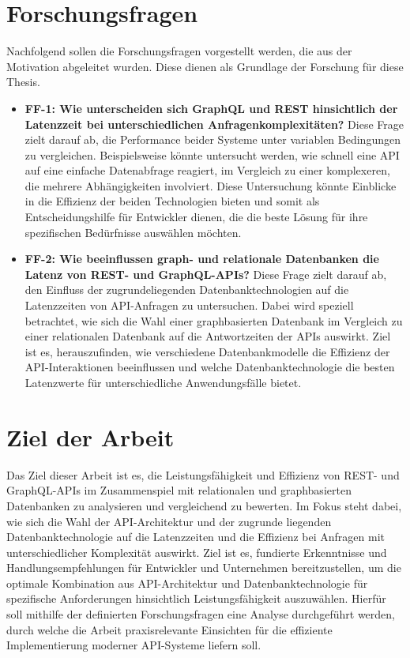\section{Forschungsfragen} %
\label{sec:forschungsfragen}
Nachfolgend sollen die Forschungsfragen vorgestellt werden, die aus der Motivation abgeleitet wurden. Diese dienen als Grundlage der Forschung für diese Thesis.
\begin{itemize}
	\item \textbf{FF-1: Wie unterscheiden sich GraphQL und REST hinsichtlich der Latenzzeit bei unterschiedlichen Anfragenkomplexitäten?}  Diese Frage zielt darauf ab, die Performance beider Systeme unter variablen Bedingungen zu vergleichen. Beispielsweise könnte untersucht werden, wie schnell eine API auf eine einfache Datenabfrage reagiert, im Vergleich zu einer komplexeren, die mehrere Abhängigkeiten involviert. Diese Untersuchung könnte Einblicke in die Effizienz der beiden Technologien bieten und somit als Entscheidungshilfe für Entwickler dienen, die die beste Lösung für ihre spezifischen Bedürfnisse auswählen möchten.
	\item \textbf{FF-2: Wie beeinflussen graph- und relationale Datenbanken die Latenz von REST- und GraphQL-APIs?} Diese Frage zielt darauf ab, den Einfluss der zugrundeliegenden Datenbanktechnologien auf die Latenzzeiten von API-Anfragen zu untersuchen. Dabei wird speziell betrachtet, wie sich die Wahl einer graphbasierten Datenbank im Vergleich zu einer relationalen Datenbank auf die Antwortzeiten der APIs auswirkt. Ziel ist es, herauszufinden, wie verschiedene Datenbankmodelle die Effizienz der API-Interaktionen beeinflussen und welche Datenbanktechnologie die besten Latenzwerte für unterschiedliche Anwendungsfälle bietet.
\end{itemize}
\section{Ziel der Arbeit} %
\label{sec:zielderarbeit}
Das Ziel dieser Arbeit ist es, die Leistungsfähigkeit und Effizienz von REST- und GraphQL-APIs im Zusammenspiel mit relationalen und graphbasierten Datenbanken zu analysieren und vergleichend zu bewerten. Im Fokus steht dabei, wie sich die Wahl der API-Architektur und der zugrunde liegenden Datenbanktechnologie auf die Latenzzeiten und die Effizienz bei Anfragen mit unterschiedlicher Komplexität auswirkt. Ziel ist es, fundierte Erkenntnisse und Handlungsempfehlungen für Entwickler und Unternehmen bereitzustellen, um die optimale Kombination aus API-Architektur und Datenbanktechnologie für spezifische Anforderungen hinsichtlich Leistungsfähigkeit auszuwählen.
Hierfür soll mithilfe der definierten Forschungsfragen eine Analyse durchgeführt werden, durch welche die Arbeit praxisrelevante Einsichten für die effiziente Implementierung moderner API-Systeme liefern soll.
\newpage
